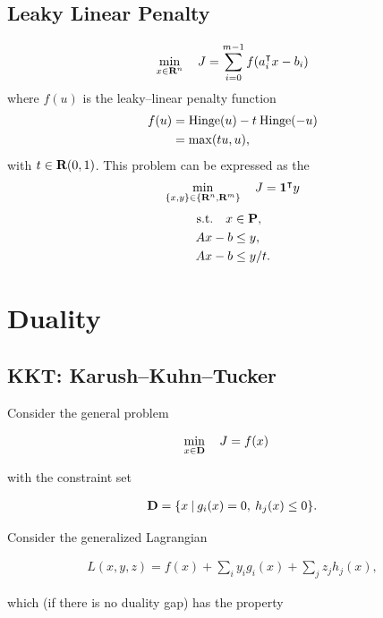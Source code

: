 \documentclass{article}
\begin{document}
\subsection{Leaky Linear Penalty}
    \begin{align*}
        \min_{x\in\textbf{R}^n}\quad J=\sum_{i=0}^{m-1}f(a_i^\intercal x-b_i)
    \end{align*}
    where $f(u)$ is the leaky--linear penalty function
    \begin{align}
        f(u)&=\text{Hinge}(u)-t\:\text{Hinge}(-u)\nonumber\\
        &=\max(t u,u),
    \end{align}
    with $t\in\textbf{R}(0,1)$.
    This problem can be expressed as the \LP
    \begin{align*}
        \min_{\{x,y\}\in\{\textbf{R}^n,\textbf{R}^m\}}\quad J= \textbf{1}^\intercal y
    \end{align*}
    \begin{align*}
        \text{s.t.}\quad x &\in \textbf{P},\\
        A x - b &\leq y,\\
        A x - b &\leq y/t.
    \end{align*}

\clearpage


\section{Duality}

\subsection{KKT: Karush--Kuhn--Tucker}

Consider the general problem

\begin{align}
    \min_{x\in\textbf{D}}\quad J&=f(x)\label{eqn:gen_constrained}
\end{align}

with the constraint set 

\begin{align*}
    \textbf{D}=\{x \:|\:g_i(x)=0,\: h_j(x)\leq 0\}.
\end{align*}

Consider the generalized Lagrangian 

\begin{align} 
    L(x,y,z) = f(x)+\sum_i y_i g_i(x)+\sum_j z_j h_j(x),
\end{align}

which (if there is no duality gap) has the property \cite{dl}
\end{document}
